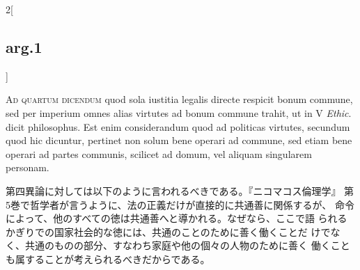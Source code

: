 \documentclass[paper=a4paper,fontsize=10pt,jafontsize=9pt,titlepage]{jlreq}
\begin{document}
\begin{paracol}{2}[\subsection{arg.1}]
\switchcolumn*[\subsection{ad.4}]

{\scshape Ad quartum dicendum} quod sola iustitia legalis directe
respicit bonum commune, sed per imperium omnes alias virtutes ad bonum
commune trahit, ut in V {\itshape Ethic}. dicit philosophus. Est enim
considerandum quod ad politicas virtutes, secundum quod hic dicuntur,
pertinet non solum bene operari ad commune, sed etiam bene operari ad
partes communis, scilicet ad domum, vel aliquam singularem personam.

\switchcolumn

第四異論に対しては以下のように言われるべきである。『ニコマコス倫理学』
 第5巻で哲学者が言うように、法の正義だけが直接的に共通善に関係するが、
 命令によって、他のすべての徳は共通善へと導かれる。なぜなら、ここで語
 られるかぎりでの国家社会的な徳には、共通のことのために善く働くことだ
 けでなく、共通のものの部分、すなわち家庭や他の個々の人物のために善く
 働くことも属することが考えられるべきだからである。

\end{paracol}
\end{document}
